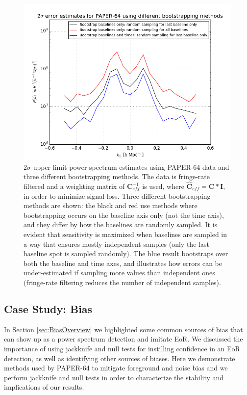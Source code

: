 \documentclass[preprint2,numberedappendix,tighten]{aastex6}  %
\begin{document}
\begin{figure}
	\centering
	\includegraphics[width=\columnwidth]{plots/data_errors.png}
	\caption{$2\sigma$ upper limit power spectrum estimates using PAPER-64 data and three different bootstrapping methods. The data is fringe-rate filtered and a weighting matrix of $\textbf{C}_{eff}^{-1}$ is used, where $\hat{\textbf{C}}_{eff} = \textbf{C}*\textbf{I}$, in order to minimize signal loss. Three different bootstrapping methods are shown: the black and red use methods where bootstrapping occurs on the baseline axis only (not the time axis), and they differ by how the baselines are randomly sampled. It is evident that sensitivity is maximized when baselines are sampled in a way that ensures mostly independent samples (only the last baseline spot is sampled randomly). The blue result bootstraps over both the baseline and time axes, and illustrates how errors can be under-estimated if sampling more values than independent ones (fringe-rate filtering reduces the number of independent samples).}
	\label{fig:data_errors}
\end{figure}


\subsection{Case Study: Bias}
\label{sec:Bias}

In Section \ref{sec:BiasOverview} we highlighted some common sources of bias that can show up as a power spectrum detection and imitate EoR. We discussed the importance of using jackknife and null tests for instilling confidence in an EoR detection, as well as identifying other sources of biases. Here we demonstrate methods used by PAPER-64 to mitigate foreground and noise bias and we perform jackknife and null tests in order to characterize the stability and implications of our results.
\end{document}
